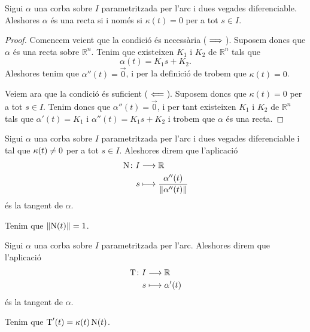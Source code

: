 \documentclass[../Apunts.tex]{subfiles}
\begin{document}
	\begin{proposition}
		\label{prop:una corba té curvatura zero si i només si és una recta}
		Sigui \(\alpha\) una corba sobre \(I\) parametritzada per l'arc i dues vegades diferenciable. Aleshores \(\alpha\) és una recta si i només si \(\kappa(t)=0\) per a tot \(s\in I\).
		\begin{proof}
			Comencem veient que la condició és necessària (\(\implies\)). Suposem doncs que \(\alpha\) és una recta sobre \(\mathbb{R}^{n}\). Tenim que existeixen \(K_{1}\) i \(K_{2}\) de \(\mathbb{R}^{n}\) tals que
			\[\alpha(t)=K_{1}s+K_{2}.\]
			Aleshores tenim que \(\alpha''(t)=\vec{0}\), i per la definició de  trobem que \(\kappa(t)=0\).
			
			Veiem ara que la condició és suficient (\(\impliedby\)). Suposem doncs que \(\kappa(t)=0\) per a tot \(s\in I\). Tenim doncs que \(\alpha''(t)=\vec{0}\), i per tant existeixen \(K_{1}\) i \(K_{2}\) de \(\mathbb{R}^{n}\) tals que \(\alpha'(t)=K_{1}\) i \(\alpha''(t)=K_{1}s+K_{2}\) i trobem que \(\alpha\) és una recta.
		\end{proof}
	\end{proposition}
	\begin{definition}
		\label{def:normal}
		Sigui \(\alpha\) una corba sobre \(I\) parametritzada per l'arc i dues vegades diferenciable i tal que \(\operatorname{\kappa}(t)\neq0\) per a tot \(s\in I\). Aleshores direm que l'aplicació
		\begin{align*}
			\normal\colon I&\longrightarrow\mathbb{R} \\
			s&\longmapsto\frac{\alpha''(t)}{\norm{\alpha''(t)}}
		\end{align*}
		és la tangent de \(\alpha\).
	\end{definition}
	\begin{observation}
		\label{obs:la normal a una corba és unitària}
		Tenim que \(\norm{\normal(t)}=1\).
	\end{observation}
	\begin{definition}
		\label{def:tangent}
		Sigui \(\alpha\) una corba sobre \(I\) parametritzada per l'arc. Aleshores direm que l'aplicació
		\begin{align*}
			\operatorname{T}\colon I&\longrightarrow\mathbb{R} \\
			s&\longmapsto\alpha'(t)
		\end{align*}
		és la tangent de \(\alpha\).
	\end{definition}
	\begin{observation}
		\label{obs:la derivada de la tangent és la curvatura per la normal}
		Tenim que \(\operatorname{T}'(t)=\operatorname{\kappa}(t)\operatorname{N}(t)\).
	\end{observation}
\end{document}
